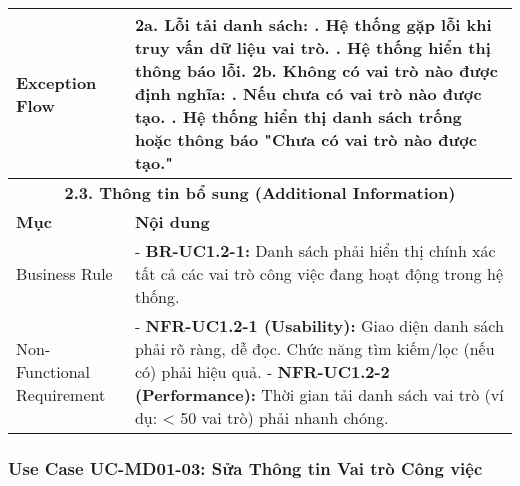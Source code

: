 \begin{longtable}{|m{4cm}|p{11cm}|}
\hline
Exception Flow & \textbf{2a. Lỗi tải danh sách:} \newline    1. Hệ thống gặp lỗi khi truy vấn dữ liệu vai trò. \newline    2. Hệ thống hiển thị thông báo lỗi. \newline \textbf{2b. Không có vai trò nào được định nghĩa:} \newline    1. Nếu chưa có vai trò nào được tạo. \newline    2. Hệ thống hiển thị danh sách trống hoặc thông báo "Chưa có vai trò nào được tạo." \\
\hline
\multicolumn{2}{|c|}{\textbf{2.3. Thông tin bổ sung (Additional Information)}} \\
\hline
\textbf{Mục} & \textbf{Nội dung} \\
\hline
Business Rule & - \textbf{BR-UC1.2-1:} Danh sách phải hiển thị chính xác tất cả các vai trò công việc đang hoạt động trong hệ thống. \\
\hline
Non-Functional Requirement & - \textbf{NFR-UC1.2-1 (Usability):} Giao diện danh sách phải rõ ràng, dễ đọc. Chức năng tìm kiếm/lọc (nếu có) phải hiệu quả. \newline - \textbf{NFR-UC1.2-2 (Performance):} Thời gian tải danh sách vai trò (ví dụ: < 50 vai trò) phải nhanh chóng. \\
\hline
\end{longtable}

\subsubsection{Use Case UC-MD01-03: Sửa Thông tin Vai trò Công việc}

